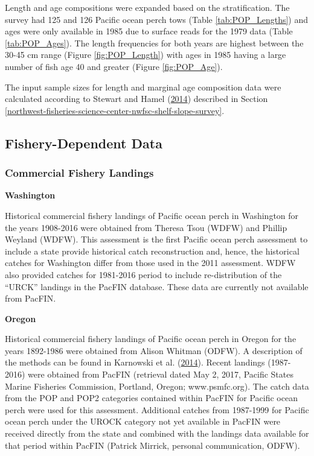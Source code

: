 \documentclass[12pt,]{article}
\begin{document}
Length and age compositions were expanded based on the stratification.
The survey had 125 and 126 Pacific ocean perch tows (Table
\ref{tab:POP_Lengths}) and ages were only available in 1985 due to
surface reads for the 1979 data (Table \ref{tab:POP_Ages}). The length
frequencies for both years are highest between the 30-45 cm range
(Figure \ref{fig:POP_Length}) with ages in 1985 having a large number of
fish age 40 and greater (Figure \ref{fig:POP_Age}).

The input sample sizes for length and marginal age composition data were
calculated according to Stewart and Hamel
(\protect\hyperlink{ref-stewart_bootstrapping_2014}{2014}) described in
Section
\ref{northwest-fisheries-science-center-nwfsc-shelf-slope-survey}.

\subsection{Fishery-Dependent Data}\label{fishery-dependent-data}

\subsubsection{Commercial Fishery
Landings}\label{commercial-fishery-landings}

\textbf{Washington}

Historical commercial fishery landings of Pacific ocean perch in
Washington for the years 1908-2016 were obtained from Theresa Tsou
(WDFW) and Phillip Weyland (WDFW). This assessment is the first Pacific
ocean perch assessment to include a state provide historical catch
reconstruction and, hence, the historical catches for Washington differ
from those used in the 2011 assessment. WDFW also provided catches for
1981-2016 period to include re-distribution of the ``URCK'' landings in
the PacFIN database. These data are currently not available from PacFIN.

\textbf{Oregon}

Historical commercial fishery landings of Pacific ocean perch in Oregon
for the years 1892-1986 were obtained from Alison Whitman (ODFW). A
description of the methods can be found in Karnowski et al.
(\protect\hyperlink{ref-karnowski_historical_2014}{2014}). Recent
landings (1987-2016) were obtained from PacFIN (retrieval dated May 2,
2017, Pacific States Marine Fisheries Commission, Portland, Oregon;
www.psmfc.org). The catch data from the POP and POP2 categories
contained within PacFIN for Pacific ocean perch were used for this
assessment. Additional catches from 1987-1999 for Pacific ocean perch
under the UROCK category not yet available in PacFIN were received
directly from the state and combined with the landings data available
for that period within PacFIN (Patrick Mirrick, personal communication,
ODFW).
\end{document}
